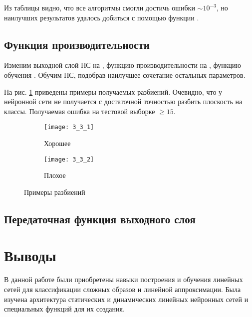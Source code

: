 Из таблицы видно, что все алгоритмы смогли достичь ошибки $\sim 10^{-3}$, но наилучших результатов удалось добиться с помощью функции .

\subsection{Функция производительности}

Изменим выходной слой НС на , функцию производительности на , функцию обучения . Обучим НС, подобрав наилучшее сочетание остальных параметров.



На рис. \ref{fig:3_3} приведены примеры получаемых разбиений. Очевидно, что у нейронной сети не получается с достаточной точностью разбить плоскость на классы. Получаемая ошибка на тестовой выборке $\geq 15$.
\begin{figure}[H]
\begin{center}
	\begin{subfigure}[b]{0.49\textwidth}
		\texttt{[image: 3\_3\_1]}
		\caption{Хорошее}
	\end{subfigure}
	\begin{subfigure}[b]{0.49\textwidth}
		\texttt{[image: 3\_3\_2]}
		\caption{Плохое}
	\end{subfigure}
	\caption{Примеры разбиений}
	\label{fig:3_3}
\end{center}
\end{figure}

\subsection{Передаточная функция выходного слоя}

\section{Выводы}

В данной работе были приобретены навыки построения и обучения линейных сетей для классификации сложных образов и линейной аппроксимации. Была изучена архитектура статических и динамических линейных нейронных сетей и специальных функций для их создания.

